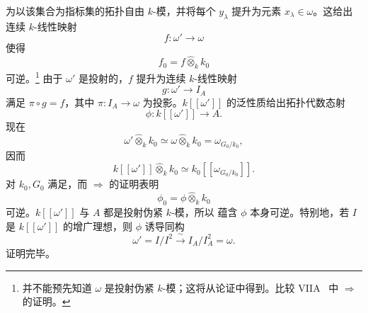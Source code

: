 为以该集合为指标集的拓扑自由 \(k\)-模，并将每个 \(y_\lambda\) 提升为元素 \(x_\lambda\in\omega\)。这给出连续 \(k\)-线性映射
\[
  f:\omega'\longrightarrow\omega
\]
使得
\[
  f_0=f\widehat\otimes_kk_0
\]
可逆。\footnote{\label{sga3:VIIB:nde:128}并不能预先知道 \(\omega\) 是投射伪紧 \(k\)-模；这将从论证中得到。比较 VIIA~ 中\textup{} \(\Rightarrow\) \textup{} 的证明。}
由于 \(\omega'\) 是投射的，\(f\) 提升为连续 \(k\)-线性映射
\[
  g:\omega'\longrightarrow I_A
\]
满足 \(\pi\circ g=f\)，其中 \(\pi:I_A\to\omega\) 为投影。\(k[[\omega']]\) 的泛性质给出拓扑代数态射
\[
  \phi:k[[\omega']]\longrightarrow A.
\]
现在
\[
  \omega'\widehat\otimes_kk_0
  \simeq
  \omega\widehat\otimes_kk_0
  =
  \omega_{G_0/k_0},
\]
因而
\[
  k[[\omega']]\widehat\otimes_kk_0
  \simeq
  k_0[[\omega_{G_0/k_0}]].
\]
对 \(k_0,G_0\) 满足\textup{}，而\textup{} \(\Rightarrow\) \textup{} 的证明表明
\[
  \phi_0=\phi\widehat\otimes_kk_0
\]
可逆。\(k[[\omega']]\) 与 \(A\) 都是投射伪紧 \(k\)-模，所以  蕴含 \(\phi\) 本身可逆。特别地，若 \(I\) 是 \(k[[\omega']]\) 的增广理想，则 \(\phi\) 诱导同构
\[
  \omega'=I/I^2
  \xrightarrow{\ \sim\ }
  I_A/I_A^2=\omega.
\]
证明完毕。
